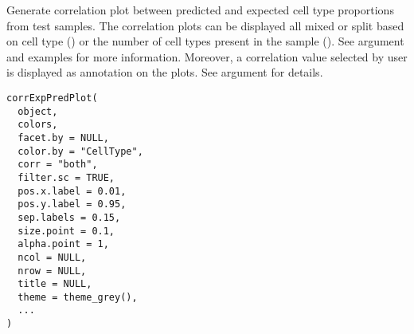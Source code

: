 \documentclass[a4paper]{book}
\begin{document}
%
\begin{Description}\relax
Generate correlation plot between predicted and expected cell type
proportions from test samples. The correlation plots can be displayed all
mixed or split based on cell type () or the number of cell
types present in the sample (). See  argument and
examples for more information. Moreover, a correlation value selected by user
is displayed as annotation on the plots. See  argument for
details.
\end{Description}
%
\begin{Usage}
\begin{verbatim}
corrExpPredPlot(
  object,
  colors,
  facet.by = NULL,
  color.by = "CellType",
  corr = "both",
  filter.sc = TRUE,
  pos.x.label = 0.01,
  pos.y.label = 0.95,
  sep.labels = 0.15,
  size.point = 0.1,
  alpha.point = 1,
  ncol = NULL,
  nrow = NULL,
  title = NULL,
  theme = theme_grey(),
  ...
)
\end{verbatim}
\end{Usage}
%
\end{document}
